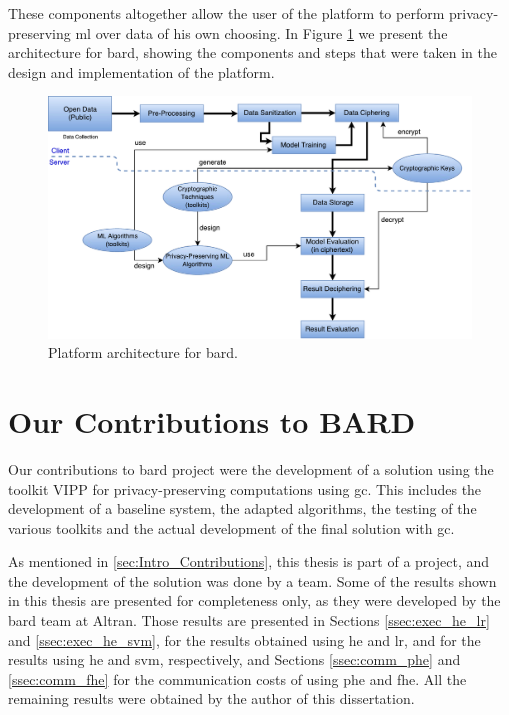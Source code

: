 These components altogether allow the user of the platform to perform privacy-preserving \ac{ml} over data of his own choosing.
In Figure \ref{fig:bard-architecture} we present the architecture for \ac{bard}, showing the components and steps that were taken in the design and implementation of the platform.

\begin{figure}[ht]
\centering
\includegraphics[width=1\textwidth]{images/BARDArchitecture.pdf}
\caption{Platform architecture for \acs{bard}.}
\label{fig:bard-architecture}
\end{figure}

\section{Our Contributions to BARD}
\label{sec:MyContributions}

Our contributions to \ac{bard} project were the development of a solution using the toolkit VIPP for privacy-preserving computations using \ac{gc}. This includes the development of a baseline system, the adapted algorithms, the testing of the various toolkits and the actual development of the final solution with \ac{gc}.

As mentioned in \ref{sec:Intro_Contributions}, this thesis is part of a project, and the development of the solution was done by a team. Some of the results shown in this thesis are presented for completeness only, as they were developed by the \ac{bard} team at Altran. Those results are presented in Sections \ref{ssec:exec_he_lr} and \ref{ssec:exec_he_svm}, for the results obtained using \ac{he} and \ac{lr}, and for the results using \ac{he} and \ac{svm}, respectively, and Sections \ref{ssec:comm_phe} and \ref{ssec:comm_fhe} for the communication costs of using \ac{phe} and \ac{fhe}. All the remaining results were obtained by the author of this dissertation.
